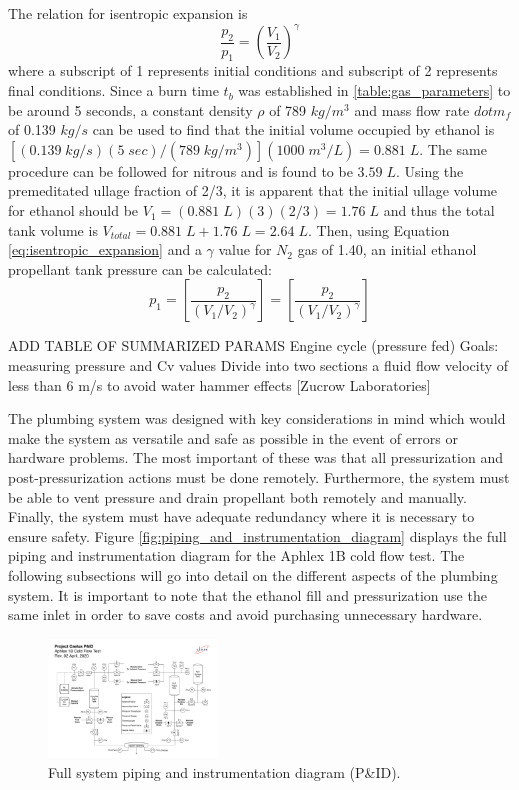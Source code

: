 \documentclass[9pt]{article} %
\numberwithin{equation}{section} %
\begin{document}
The relation for isentropic expansion is
\begin{equation} \label{eq:isentropic_expansion}
\frac{p_{2}}{p_{1}} = \left( \frac{V_{1}}{V_{2}} \right) ^{\gamma}
\end{equation}
where a subscript of 1 represents initial conditions and subscript of 2 represents final conditions. Since a burn time $t_{b}$ was established in \ref{table:gas_parameters} to be around 5 seconds, a constant density $\rho$ of 789 $kg/m^{3}$ and mass flow rate $dot{m}_{f}$ of 0.139 $kg/s$ can be used to find that the initial volume occupied by ethanol is $[(0.139 \; kg/s)(5 \; sec)/(789 \; kg/m^{3})](1000 \; m^{3}/L) = 0.881 \; L$. The same procedure can be followed for nitrous and is found to be $3.59 \; L$. Using the premeditated ullage fraction of 2/3, it is apparent that the initial ullage volume for ethanol should be $V_{1} = (0.881 \; L)(3)(2/3) = 1.76 \; L$ and thus the total tank volume is $V_{total} = 0.881 \; L + 1.76 \; L = 2.64 \; L$. Then, using Equation \ref{eq:isentropic_expansion} and a $\gamma$ value for $N_{2}$ gas of 1.40,  an initial ethanol propellant tank pressure can be calculated:
\begin{equation*}
p_{1} = \left[ \frac{p_{2}}{(V_{1}/V_{2})^{\gamma}} \right] = \left[ \frac{p_{2}}{(V_{1}/V_{2})^{\gamma}} \right]
\end{equation*}

ADD TABLE OF SUMMARIZED PARAMS
Engine cycle (pressure fed)
Goals: measuring pressure and Cv values
Divide into two sections
a fluid flow velocity of less than 6 m/s to avoid water hammer effects [Zucrow Laboratories]

The plumbing system was designed with key considerations in mind which would make the system as versatile and safe as possible in the event of errors or hardware problems. The most important of these was that all pressurization and post-pressurization actions must be done remotely. Furthermore, the system must be able to vent pressure and drain propellant both remotely and manually. Finally, the system must have adequate redundancy where it is necessary to ensure safety. Figure \ref{fig:piping_and_instrumentation_diagram} displays the full piping and instrumentation diagram for the Aphlex 1B cold flow test. The following subsections will go into detail on the different aspects of the plumbing system. It is important to note that the ethanol fill and pressurization use the same inlet in order to save costs and avoid purchasing unnecessary hardware.

\begin{figure}[!htb]
    \centering
    \includegraphics[scale=0.5, width=0.4\textwidth, trim={0cm 0cm 0cm 5cm}, clip]{Aphlex1B_04-02-2020_P&ID.pdf} %
    \caption{Full system piping and instrumentation diagram (P\&ID).}
    \label{fig:pid_2}
\end{figure}
\end{document}
